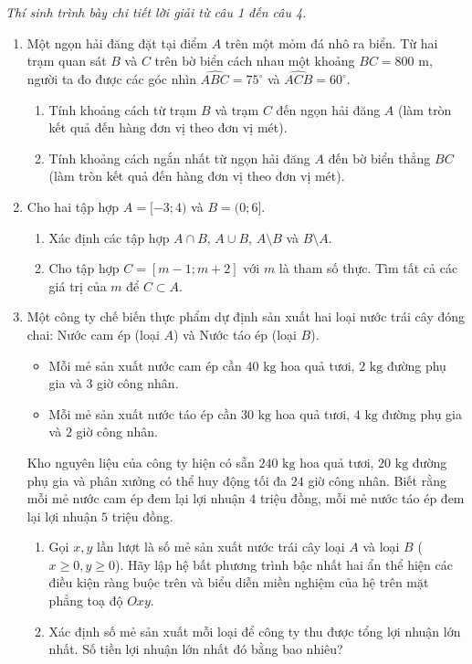 \documentclass[12pt,a4paper]{article}
\newcommand{\parttitle}[1]{\par\vspace{1.5pt}\needspace{2\baselineskip}{\large\bfseries\color{ink}#1}\par\nopagebreak\vspace{1pt}}
\begin{document}
\parttitle{PHẦN IV. Tự luận}
\textit{Thí sinh trình bày chi tiết lời giải từ câu 1 đến câu 4.}
\begin{enumerate}
\item Một ngọn hải đăng đặt tại điểm $A$ trên một mỏm đá nhô ra biển. Từ hai trạm quan sát $B$ và $C$ trên bờ biển cách nhau một khoảng $BC = 800\text{ m}$, người ta đo được các góc nhìn $\widehat{ABC} = 75^\circ$ và $\widehat{ACB} = 60^\circ$.
\begin{enumerate}
    \item Tính khoảng cách từ trạm $B$ và trạm $C$ đến ngọn hải đăng $A$ (làm tròn kết quả đến hàng đơn vị theo đơn vị mét).
    \item Tính khoảng cách ngắn nhất từ ngọn hải đăng $A$ đến bờ biển thẳng $BC$ (làm tròn kết quả đến hàng đơn vị theo đơn vị mét).
\end{enumerate}

\item Cho hai tập hợp $A = [-3; 4)$ và $B = (0; 6]$.
\begin{enumerate}
    \item Xác định các tập hợp $A \cap B$, $A \cup B$, $A \setminus B$ và $B \setminus A$.
    \item Cho tập hợp $C = [m - 1; m + 2]$ với $m$ là tham số thực. Tìm tất cả các giá trị của $m$ để $C \subset A$.
\end{enumerate}

\item Một công ty chế biến thực phẩm dự định sản xuất hai loại nước trái cây đóng chai: Nước cam ép (loại $A$) và Nước táo ép (loại $B$).
\begin{itemize}[leftmargin=1.5em, itemsep=0.1pt]
    \item Mỗi mẻ sản xuất nước cam ép cần $40\text{ kg}$ hoa quả tươi, $2\text{ kg}$ đường phụ gia và $3$ giờ công nhân.
    \item Mỗi mẻ sản xuất nước táo ép cần $30\text{ kg}$ hoa quả tươi, $4\text{ kg}$ đường phụ gia và $2$ giờ công nhân.
\end{itemize}
Kho nguyên liệu của công ty hiện có sẵn $240\text{ kg}$ hoa quả tươi, $20\text{ kg}$ đường phụ gia và phân xưởng có thể huy động tối đa $24$ giờ công nhân. Biết rằng mỗi mẻ nước cam ép đem lại lợi nhuận $4$ triệu đồng, mỗi mẻ nước táo ép đem lại lợi nhuận $5$ triệu đồng.
\begin{enumerate}
    \item Gọi $x, y$ lần lượt là số mẻ sản xuất nước trái cây loại $A$ và loại $B$ ($x \ge 0, y \ge 0$). Hãy lập hệ bất phương trình bậc nhất hai ẩn thể hiện các điều kiện ràng buộc trên và biểu diễn miền nghiệm của hệ trên mặt phẳng toạ độ $Oxy$.
    \item Xác định số mẻ sản xuất mỗi loại để công ty thu được tổng lợi nhuận lớn nhất. Số tiền lợi nhuận lớn nhất đó bằng bao nhiêu?
\end{enumerate}


\end{enumerate}
\end{document}
